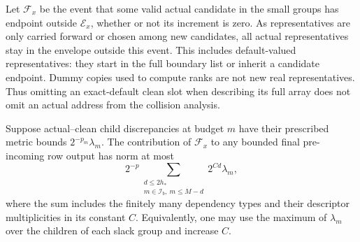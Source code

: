 Let $\mathcal F_x$ be the event that some valid actual candidate in the
small groups has endpoint outside $\mathcal E_x$, whether or not its
increment is zero.  As representatives are
only carried forward or chosen among new candidates, all actual
representatives stay in the envelope outside this event.
This includes default-valued representatives: they start in the full
boundary list or inherit a candidate endpoint.  Dummy copies used to
compute ranks are not new real representatives.  Thus omitting an
exact-default clean slot when describing its full array does not omit
an actual address from the collision analysis.

\begin{lemma}\label{lem:fp-escape}
Suppose actual--clean child discrepancies at budget $m$ have their
prescribed metric bounds $2^{-p_m}\lambda_m$.  The contribution of
$\mathcal F_x$ to any bounded final pre-incoming row output has norm at
most
\begin{equation}
 2^{-p}\sum_{\substack{d\le2h_*\\m\in\mathcal I_b,\ m\le M-d}}
                 2^{C d}\lambda_m,
 \label{eq:fp-escape-charge}
\end{equation}
where the sum includes the finitely many dependency types and their
descriptor multiplicities in its constant $C$.  Equivalently, one may
use the maximum of $\lambda_m$ over the children of each slack group
and increase $C$.
\end{lemma}

